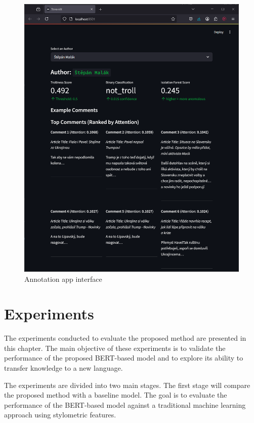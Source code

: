 \documentclass[twoside]{ctuthesis}
\theoremstyle{plain}
\theoremstyle{definition}
\theoremstyle{note}
\begin{document}
\begin{figure}[htbp]          
	\centering                 
	\includegraphics[scale=0.43]{figures/streamlit_app.png}
	\caption{Annotation app interface}    
	\label{fig:my_app}          
\end{figure}

\chapter{Experiments}

The experiments conducted to evaluate the proposed method are presented in this chapter. The main objective of these experiments is to validate the performance of the proposed BERT-based model and to explore its ability to transfer knowledge to a new language.\par

The experiments are divided into two main stages. The first stage will compare the proposed method with a baseline model. The goal is to evaluate the performance of the BERT-based model against a traditional machine learning approach using stylometric features.\par
\end{document}
